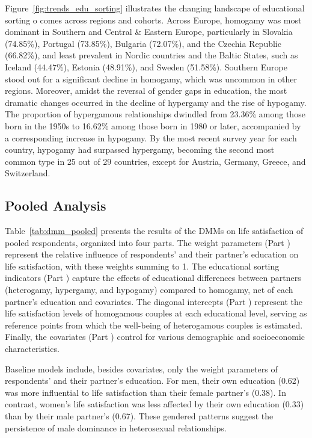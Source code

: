 Figure~\ref{fig:trends_edu_sorting} illustrates the changing landscape of educational sorting o comes across regions and cohorts. Across Europe, homogamy was most dominant in Southern and Central \& Eastern Europe, particularly in Slovakia (74.85\%), Portugal (73.85\%), Bulgaria (72.07\%), and the Czechia Republic (66.82\%), and least prevalent in Nordic countries and the Baltic States, such as Iceland (44.47\%), Estonia (48.91\%), and Sweden (51.58\%). Southern Europe stood out for a significant decline in homogamy, which was uncommon in other regions. Moreover, amidst the reversal of gender gaps in education, the most dramatic changes occurred in the decline of hypergamy and the rise of hypogamy. The proportion of hypergamous relationships dwindled from 23.36\% among those born in the 1950s to 16.62\% among those born in 1980 or later, accompanied by a corresponding increase in hypogamy. By the most recent survey year for each country, hypogamy had surpassed hypergamy, becoming the second most common type in 25 out of 29 countries, except for Austria, Germany, Greece, and Switzerland.

\subsection{Pooled Analysis}

Table~\ref{tab:dmm_pooled} presents the results of the DMMs on life satisfaction of pooled respondents, organized into four parts. The weight parameters (Part ) represent the relative influence of respondents' and their partner's education on life satisfaction, with these weights summing to 1. The educational sorting indicators (Part ) capture the effects of educational differences between partners (heterogamy, hypergamy, and hypogamy) compared to homogamy, net of each partner's education and covariates. The diagonal intercepts (Part ) represent the life satisfaction levels of homogamous couples at each educational level, serving as reference points from which the well-being of heterogamous couples is estimated. Finally, the covariates (Part ) control for various demographic and socioeconomic characteristics.

Baseline models include, besides covariates, only the weight parameters of respondents' and their partner's education. For men, their own education (0.62) was more influential to life satisfaction than their female partner's (0.38). In contrast, women's life satisfaction was less affected by their own education (0.33) than by their male partner's (0.67). These gendered patterns suggest the persistence of male dominance in heterosexual relationships.

